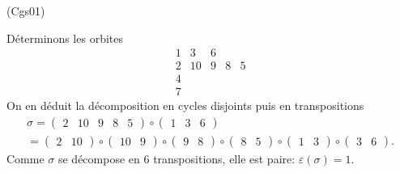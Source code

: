 \begin{tiny}(Cgs01)\end{tiny} Déterminons les orbites
\[
  \begin{matrix}
    1 & 3  & 6 &   &   \\
    2 & 10 & 9 & 8 & 5 \\
    4 &    &   &   &   \\
    7 &    &   &   &   
  \end{matrix}
\]
On en déduit la décomposition en cycles disjoints puis en transpositions
\begin{multline*}
  \sigma =
  \begin{pmatrix}
    2 & 10 & 9 & 8 & 5
  \end{pmatrix}
  \circ 
  \begin{pmatrix}
    1 & 3  & 6
  \end{pmatrix}\\
  =
  \begin{pmatrix}
    2 & 10
  \end{pmatrix}
  \circ
  \begin{pmatrix}
    10 & 9
  \end{pmatrix}
  \circ
  \begin{pmatrix}
    9 & 8
  \end{pmatrix}
  \circ
  \begin{pmatrix}
    8 & 5
  \end{pmatrix}
  \circ
  \begin{pmatrix}
    1 & 3
  \end{pmatrix}
  \circ
  \begin{pmatrix}
    3 & 6
  \end{pmatrix}
  .
\end{multline*}
Comme $\sigma$ se décompose en 6 transpositions, elle est paire: $\varepsilon(\sigma) = 1$.
